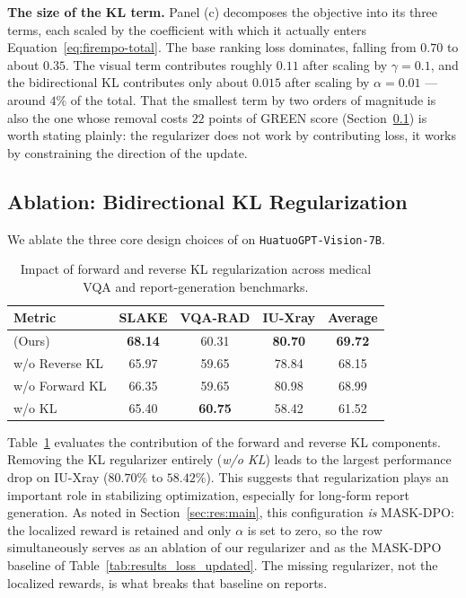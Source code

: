 \textbf{The size of the KL term.} Panel (c) decomposes the \ourloss{} objective into its three terms, each scaled by the coefficient with which it actually enters Equation~\ref{eq:firempo-total}. The base ranking loss dominates, falling from $0.70$ to about $0.35$. The visual term contributes roughly $0.11$ after scaling by $\gamma = 0.1$, and the bidirectional KL contributes only about $0.015$ after scaling by $\alpha = 0.01$ --- around $4\%$ of the total. That the smallest term by two orders of magnitude is also the one whose removal costs $22$ points of GREEN score (Section~\ref{sec:res:abl-kl}) is worth stating plainly: the regularizer does not work by contributing loss, it works by constraining the direction of the update.

\subsection{Ablation: Bidirectional KL Regularization}
\label{sec:res:abl-kl}

We ablate the three core design choices of \ourloss{} on \texttt{HuatuoGPT-Vision-7B}.

\begin{table}[ht]
\centering
\small
\caption{Impact of forward and reverse KL regularization across medical VQA and report-generation benchmarks.}
\label{tab:regularizer}
\begin{tabular}{lcccc}
\toprule
\textbf{Metric} & \textbf{SLAKE} & \textbf{VQA-RAD} & \textbf{IU-Xray} & \textbf{Average} \\
\midrule
\ourloss{} (Ours) & \textbf{68.14} & {60.31} & \textbf{80.70} & \textbf{69.72}\\
\midrule
w/o Reverse KL & 65.97 & 59.65 & 78.84 & 68.15 \\
w/o Forward KL & 66.35 & 59.65 & 80.98 & 68.99  \\
w/o KL         & 65.40 & \textbf{60.75} & 58.42 & 61.52\\
\bottomrule
\end{tabular}
\end{table}

Table~\ref{tab:regularizer} evaluates the contribution of the forward and reverse KL components. Removing the KL regularizer entirely (\emph{w/o KL}) leads to the largest performance drop on IU-Xray ($80.70\%$ to $58.42\%$). This suggests that regularization plays an important role in stabilizing optimization, especially for long-form report generation. As noted in Section~\ref{sec:res:main}, this configuration \emph{is} MASK-DPO: the localized reward is retained and only $\alpha$ is set to zero, so the row simultaneously serves as an ablation of our regularizer and as the MASK-DPO baseline of Table~\ref{tab:results_loss_updated}. The missing regularizer, not the localized rewards, is what breaks that baseline on reports.

